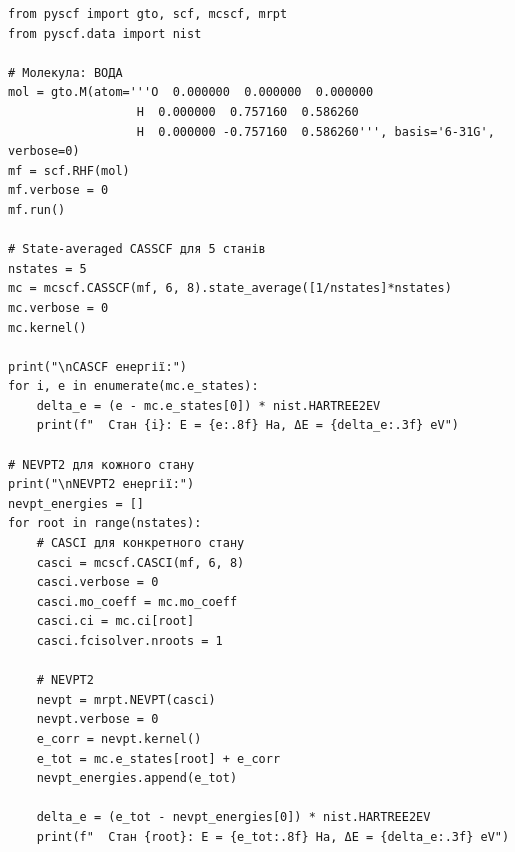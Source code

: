 \begin{verbatim}
from pyscf import gto, scf, mcscf, mrpt
from pyscf.data import nist

# Молекула: ВОДА
mol = gto.M(atom='''O  0.000000  0.000000  0.000000
                  H  0.000000  0.757160  0.586260
                  H  0.000000 -0.757160  0.586260''', basis='6-31G', verbose=0)
mf = scf.RHF(mol)
mf.verbose = 0
mf.run()

# State-averaged CASSCF для 5 станів
nstates = 5
mc = mcscf.CASSCF(mf, 6, 8).state_average([1/nstates]*nstates)
mc.verbose = 0
mc.kernel()

print("\nCASCF енергії:")
for i, e in enumerate(mc.e_states):
    delta_e = (e - mc.e_states[0]) * nist.HARTREE2EV
    print(f"  Стан {i}: E = {e:.8f} Ha, ΔE = {delta_e:.3f} eV")

# NEVPT2 для кожного стану
print("\nNEVPT2 енергії:")
nevpt_energies = []
for root in range(nstates):
    # CASCI для конкретного стану
    casci = mcscf.CASCI(mf, 6, 8)
    casci.verbose = 0
    casci.mo_coeff = mc.mo_coeff
    casci.ci = mc.ci[root]
    casci.fcisolver.nroots = 1

    # NEVPT2
    nevpt = mrpt.NEVPT(casci)
    nevpt.verbose = 0
    e_corr = nevpt.kernel()
    e_tot = mc.e_states[root] + e_corr
    nevpt_energies.append(e_tot)

    delta_e = (e_tot - nevpt_energies[0]) * nist.HARTREE2EV
    print(f"  Стан {root}: E = {e_tot:.8f} Ha, ΔE = {delta_e:.3f} eV")
\end{verbatim}



%

